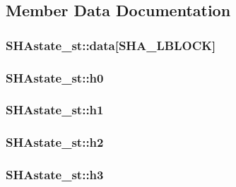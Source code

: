 \subsection{Member Data Documentation}
\subsubsection[{\texorpdfstring{data}{data}}]{ S\+H\+Astate\+\_\+st\+::data\mbox{[}{\bf S\+H\+A\+\_\+\+L\+B\+L\+O\+CK}\mbox{]}}\hypertarget{struct_s_h_astate__st_ae8c8b0b2b3c60370a97459696f93e9da}{}\label{struct_s_h_astate__st_ae8c8b0b2b3c60370a97459696f93e9da}
\subsubsection[{\texorpdfstring{h0}{h0}}]{ S\+H\+Astate\+\_\+st\+::h0}\hypertarget{struct_s_h_astate__st_ab3041c8fb56553e66f5e96bea583181c}{}\label{struct_s_h_astate__st_ab3041c8fb56553e66f5e96bea583181c}
\subsubsection[{\texorpdfstring{h1}{h1}}]{ S\+H\+Astate\+\_\+st\+::h1}\hypertarget{struct_s_h_astate__st_aae63de503961d0e23ec45fadbf762a28}{}\label{struct_s_h_astate__st_aae63de503961d0e23ec45fadbf762a28}
\subsubsection[{\texorpdfstring{h2}{h2}}]{ S\+H\+Astate\+\_\+st\+::h2}\hypertarget{struct_s_h_astate__st_a553b3daa14d04597c861e2482d984761}{}\label{struct_s_h_astate__st_a553b3daa14d04597c861e2482d984761}
\subsubsection[{\texorpdfstring{h3}{h3}}]{ S\+H\+Astate\+\_\+st\+::h3}\hypertarget{struct_s_h_astate__st_a5219d68f2bee6867f2775d467691ad24}{}\label{struct_s_h_astate__st_a5219d68f2bee6867f2775d467691ad24}
